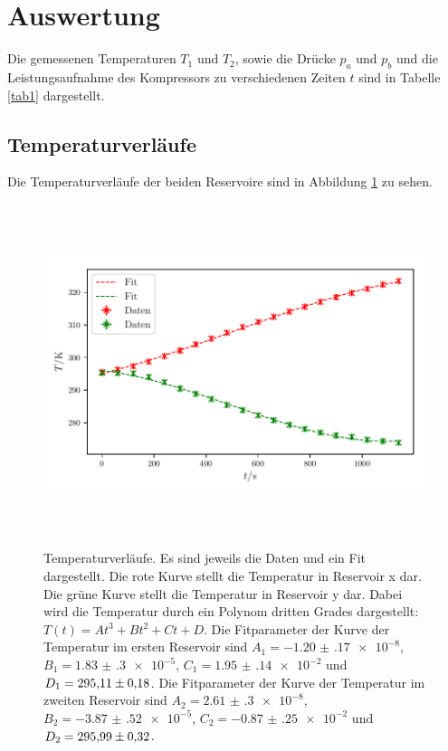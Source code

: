 \section{Auswertung}
\label{sec:Auswertung}

Die gemessenen Temperaturen $T_1$ und $T_2$, sowie die Drücke
$p_a$ und $p_b$ und die Leistungsaufnahme des Kompressors
zu verschiedenen Zeiten $t$ sind in Tabelle \ref{tab1}
dargestellt.


\subsection{Temperaturverläufe}
Die Temperaturverläufe der beiden Reservoire sind in Abbildung
\ref{fig:plot1} zu sehen.

\begin{figure} %
    \centering
    \includegraphics[width=14cm, height=10cm]{build/plot1.pdf}
    \caption{Temperaturverläufe. Es sind jeweils die Daten und ein Fit dargestellt.
    Die rote Kurve stellt die Temperatur in Reservoir x dar. Die grüne Kurve stellt 
    die Temperatur in Reservoir y dar. Dabei wird die Temperatur
    durch ein Polynom dritten Grades dargestellt: $T(t) = At^3+Bt^2+Ct+D$. 
    Die Fitparameter der Kurve der Temperatur im ersten Reservoir sind $A_1=\num{-1.20(17)e-8}$,
    $B_1=\num{1.83(30)e-5}$, $C_1=\num{1.95(14)e-2}$ und $D_1=\num{295.11 \pm 0.18}$.
    Die Fitparameter der Kurve der Temperatur im zweiten Reservoir sind $A_2=\num{2.61(30)e-8}$,
$B_2=\num{-3.87(52)e-5}$, $C_2=\num{-0.87(25)e-2}$ und $D_2=\num{295.99 \pm 0.32}$.} %

    \label{fig:plot1}
\end{figure}


